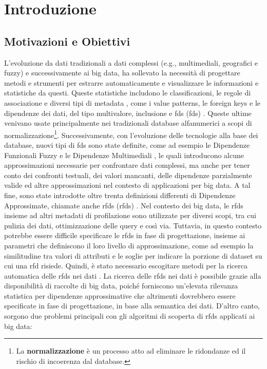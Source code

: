 \chapter{Introduzione}

\section{Motivazioni e Obiettivi} %
L'evoluzione da dati tradizionali a dati complessi (e.g., multimediali, geografici e fuzzy) e successivamente ai big data, ha sollevato la necessit\`{a} di progettare metodi e strumenti per estrarre automaticamente e visualizzare le informazioni e statistiche da questi. Queste statistiche includono le classificazioni, le regole di associazione e diversi tipi di metadata \cite{profiling-relational-data}, come i value patterns, le foreign keys e le dipendenze dei dati, del tipo multivalore, inclusione e \acrlong{fds} (\acrshort{fds}) \cite{surveydatabasedependency}. Queste ultime venivano usate principalmente nei tradizionali database alfanumerici a scopi di normalizzazione\footnote{La \textbf{normalizzazione} \`{e} un processo atto ad eliminare le ridondanze ed il rischio di incoerenza dal database.}. Successivamente, con l'evoluzione delle tecnologie alla base dei database, nuovi tipi di \acrlong{fds} sono state definite, come ad esempio le Dipendenze Funzionali Fuzzy \cite{ffdandlljoin} e le Dipendenze Multimediali \cite{nomalizationframework}, le quali introducono alcune approssimazioni necessarie per confrontare dati complessi, ma anche per tener conto dei confronti testuali, dei valori mancanti, delle dipendenze parzialmente valide ed altre approssimazioni nel contesto di applicazioni per big data. A tal fine, sono state introdotte oltre trenta definizioni differenti di Dipendenze Approssimate, chiamate anche \acrlong{rfds} (\acrshort{rfds}) \cite{rfdsurvey}. Nel contesto dei big data, le \acrlong{rfds} insieme ad altri metadati di profilazione sono utilizzate per diversi scopi, tra cui pulizia dei dati, ottimizzazione delle query e cos\`{i} via. Tuttavia, in questo contesto potrebbe essere difficile specificare le \acrlong{rfds} in fase di progettazione, insieme ai parametri che definiscono il loro livello di approssimazione, come ad esempio la similitudine tra valori di attributi e le soglie per indicare la porzione di dataset su cui una \acrlong{rfd} risiede. Quindi, \`{e} stato necessario escogitare metodi per la ricerca automatica delle \acrlong{rfds} nei dati \cite{ddiscoveryfromdata}. La ricerca delle \acrlong{rfds} nei dati \`{e} possibile grazie alla disponibilit\`{a} di raccolte di big data, poich\'{e} forniscono un'elevata rilevanza statistica per dipendenze approssimative che altrimenti dovrebbero essere specificate in fase di progettazione, in base alla semantica dei dati. D'altro canto, sorgono due problemi principali con gli algoritmi di scoperta di \acrlong{rfds} applicati ai big data:

